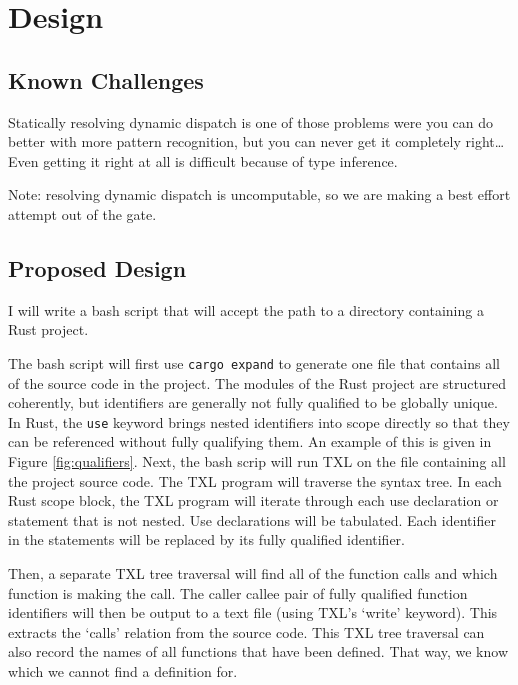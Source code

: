 \documentclass[11pt]{article}
\begin{document}
\section{Design}

\subsection{Known Challenges}
Statically resolving dynamic dispatch is one of those problems were you can do better with more pattern recognition, but you can never get it completely right\dots
Even getting it right at all is difficult because of type inference.

Note: resolving dynamic dispatch is uncomputable, so we are making a best effort attempt out of the gate.

\subsection{Proposed Design}

I will write a bash script that will accept the path to a directory containing a Rust project.

The bash script will first use \lstinline{cargo expand} to generate one file that contains all of the source code in the project.
The modules of the Rust project are structured coherently, but identifiers are generally not fully qualified to be globally unique.
In Rust, the \lstinline{use} keyword brings nested identifiers into scope directly so that they can be referenced without fully qualifying them.
An example of this is given in Figure \ref{fig:qualifiers}.
Next, the bash scrip will run TXL on the file containing all the project source code.
The TXL program will traverse the syntax tree.
In each Rust scope block, the TXL program will iterate through each use declaration or statement that is not nested.
Use declarations will be tabulated.
Each identifier in the statements will be replaced by its fully qualified identifier.

Then, a separate TXL tree traversal will find all of the function calls and which function is making the call.
The caller callee pair of fully qualified function identifiers will then be output to a text file (using TXL's `write' keyword).
This extracts the `calls' relation from the source code.
This TXL tree traversal can also record the names of all functions that have been defined.
That way, we know which we cannot find a definition for.
\end{document}
